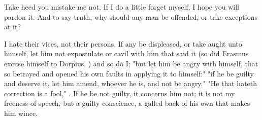 
Take heed you mistake me not. If I do a little forget myself, I hope you will
pardon it. And to say truth, why should any man be offended, or take exceptions
at it?


I hate their vices, not their persons. If any be displeased, or take aught unto
himself, let him not expostulate or cavil with him that said it (so did
Erasmus excuse himself to Dorpius, ) and so do I; "but let him be angry with himself, that so
betrayed and opened his own faults in applying it to himself:"
"if he be guilty and deserve it, let him amend, whoever he
is, and not be angry." "He that hateth correction is a fool," . If he be not guilty, it concerns him not; it is not my freeness
of speech, but a guilty conscience, a galled back of his own that makes him
wince.


